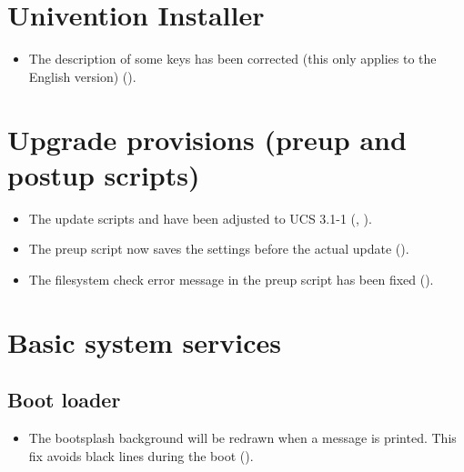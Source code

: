 \section{Univention Installer}
\begin{itemize}
\item The description of some keys has been corrected (this only applies to the English version) ().
\end{itemize}



\section{Upgrade provisions (preup and postup scripts)}

\begin{itemize}

\item The update scripts  and  have
been adjusted to UCS 3.1-1 (, ).

\item The preup script now saves the \ucsUCR{} settings before
the actual update ().

\item The filesystem check error message in the preup script has been
fixed ().

\end{itemize}

\section{Basic system services}

\subsection{Boot loader}
\begin{itemize}
\item The bootsplash background will be redrawn when a message is printed. 
      This fix avoids black lines during the boot ().
\end{itemize}

